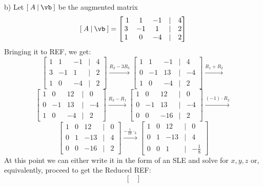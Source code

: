  \begin{solution}
 b) Let $[\:A\:|\:\vb\:] $ be the augmented matrix
 \[ [\:A\:|\:\vb\:] = \begin{bmatrix}\

     1&1&-1&\vert&4\\
     3&-1&1&\vert&2\\
     1&0&-4&\vert&2
 \end{bmatrix} \]
 Bringing it to REF, we get:
 \[
 \begin{bmatrix}

     1&1&-1&\vert&4\\
     3&-1&1&\vert&2\\
     1&0&-4&\vert&2
 \end{bmatrix} 
 \xrightarrow{R_2-3R_3}
 \begin{bmatrix}
     1&1&-1&\vert&4\\
     0&-1&13&\vert&-4\\
     1&0&-4&\vert&2
 \end{bmatrix} 
 \xrightarrow{R_1+R_2}\]\[
 \begin{bmatrix}
     1&0&12&\vert&0\\
     0&-1&13&\vert&-4\\
     1&0&-4&\vert&2
 \end{bmatrix} 
 \xrightarrow{R_3-R_1}
 \begin{bmatrix}
     1&0&12&\vert&0\\
     0&-1&13&\vert&-4\\
     0&0&-16&\vert&2
 \end{bmatrix} 
 \xrightarrow{(-1)\cdot R_2}\]\[
 \begin{bmatrix}
     1&0&12&\vert&0\\
     0&1&-13&\vert&4\\
     0&0&-16&\vert&2
 \end{bmatrix} 
 \xrightarrow{-\frac{1}{16}\cdot _3}
 \begin{bmatrix}
     1&0&12&\vert&0\\
     0&1&-13&\vert&4\\
     0&0&1&\vert&-\frac{1}{8}
 \end{bmatrix} 
 \]
 At this point we can either write it in the form of an SLE and solve for $x,y,z$ or, equivalently, proceed to get the Reduced REF:
 \[
 \begin{bmatrix}


\end{bmatrix}\]
\end{solution}
